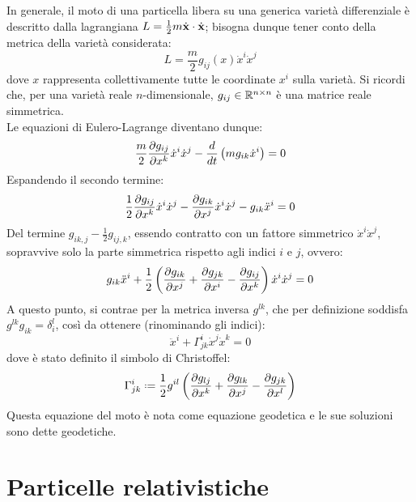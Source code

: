 In generale, il moto di una particella libera su una generica varietà differenziale è descritto dalla lagrangiana $ L = \frac{1}{2}m \dot{\mathbf{x}}\cdot\dot{\mathbf{x}} $; bisogna dunque tener conto della metrica della varietà considerata:
\begin{equation}
  L = \frac{m}{2} g_{ij}(x) \dot{x}^i \dot{x}^j
  \label{eq:1.4}
\end{equation}
dove $ x $ rappresenta collettivamente tutte le coordinate $ x^i $ sulla varietà. Si ricordi che, per una varietà reale $ n $-dimensionale, $ g_{ij}\in\mathbb{R}^{n\times n} $ è una matrice reale simmetrica.\\
Le equazioni di Eulero-Lagrange diventano dunque:
\begin{equation}
  \frac{m}{2} \frac{\partial g_{ij}}{\partial x^k} \dot{x}^i \dot{x}^j - \frac{d}{dt} \left( m g_{ik} \dot{x}^i \right) = 0
  \label{eq:1.5}
\end{equation}
Espandendo il secondo termine:
\begin{equation}
  \frac{1}{2} \frac{\partial g_{ij}}{\partial x^k} \dot{x}^i \dot{x}^j - \frac{\partial g_{ik}}{\partial x^j} \dot{x}^i \dot{x}^j - g_{ik} \ddot{x}^i = 0
  \label{eq:1.6}
\end{equation}
Del termine $ g_{ik,j} - \frac{1}{2} g_{ij,k} $, essendo contratto con un fattore simmetrico $ \dot{x}^i \dot{x}^j $, sopravvive solo la parte simmetrica rispetto agli indici $ i $ e $ j $, ovvero:
\begin{equation}
  g_{ik} \ddot{x}^i + \frac{1}{2}\left( \frac{\partial g_{ik}}{\partial x^j} + \frac{\partial g_{jk}}{\partial x^i} - \frac{\partial g_{ij}}{\partial x^k} \right) \dot{x}^i \dot{x}^j = 0
  \label{eq:1.7}
\end{equation}
A questo punto, si contrae per la metrica inversa $ g^{lk} $, che per definizione soddisfa $ g^{lk} g_{ik} = \delta^l_i $, così da ottenere (rinominando gli indici):
\begin{equation}
  \ddot{x}^i + \Gamma^i_{jk} \dot{x}^j \dot{x}^k = 0
  \label{eq:1.8}
\end{equation}
dove è stato definito il simbolo di Christoffel:
\begin{equation}
  \Gamma^i_{jk} \defeq \frac{1}{2} g^{il} \left( \frac{\pa g_{lj}}{\pa x^k} + \frac{\pa g_{lk}}{\pa x^j} - \frac{\pa g_{jk}}{\pa x^l} \right)
  \label{eq:1.9}
\end{equation}
Questa equazione del moto è nota come equazione geodetica e le sue soluzioni sono dette geodetiche.

\section{Particelle relativistiche}

